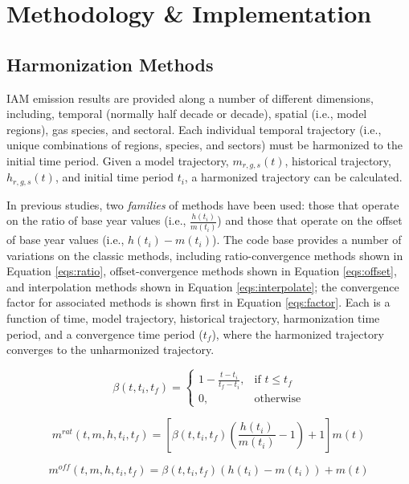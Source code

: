 
\section{Methodology \& Implementation}

\subsection{Harmonization Methods}

IAM emission results are provided along a number of different dimensions,
including, temporal (normally half decade or decade), spatial (i.e., model
regions), gas species, and sectoral. Each individual temporal trajectory (i.e.,
unique combinations of regions, species, and sectors) must be harmonized to the
initial time period. Given a model trajectory, $m_{r, g, s}(t)$, historical
trajectory, $h_{r, g, s}(t)$, and initial time period $t_i$, a harmonized
trajectory can be calculated.

In previous studies, two \textit{families} of methods have been used: those that
operate on the ratio of base year values (i.e., $\frac{h(t_i)}{m(t_i)}$) and
those that operate on the offset of base year values (i.e., $h(t_i) -
m(t_i)$). The  code base provides a number of variations on the
classic methods, including ratio-convergence methods shown in Equation
\ref{eqs:ratio}, offset-convergence methods shown in Equation \ref{eqs:offset},
and interpolation methods shown in Equation \ref{eqs:interpolate}; the
convergence factor for associated methods is shown first in Equation
\ref{eqs:factor}. Each is a function of time, model trajectory, historical
trajectory, harmonization time period, and a convergence time period ($t_f$),
where the harmonized trajectory converges to the unharmonized trajectory.

\begin{equation}\label{eqs:factor}
  \beta(t, t_i, t_f) =
  \begin{cases}
    1 - \frac{t - t_i}{t_f - t_i},& \text{if } t \leq t_f\\
    0,                        & \text{otherwise}
  \end{cases}
\end{equation}

\begin{equation}\label{eqs:ratio}
  m^{rat}(t, m, h, t_i, t_f) = [\beta(t, t_i, t_f) (\frac{h(t_i)}{m(t_i)} - 1) + 1] m(t)
\end{equation}

\begin{equation}\label{eqs:offset}
  m^{off}(t, m, h, t_i, t_f) = \beta(t, t_i, t_f) (h(t_i) - m(t_i)) + m(t)
\end{equation}
  
